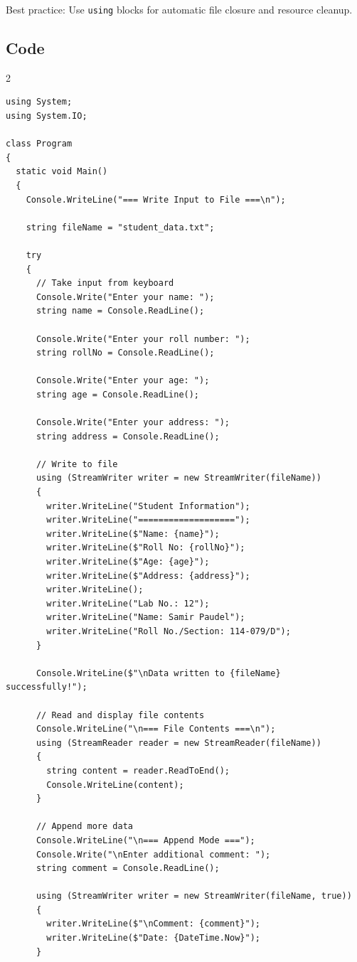 \documentclass[10pt,a4paper]{article}
\begin{document}
Best practice: Use \texttt{using} blocks for automatic file closure and resource cleanup.

\subsection*{Code}
\begin{multicols}{2}
\begin{lstlisting}
using System;
using System.IO;

class Program
{
  static void Main()
  {
    Console.WriteLine("=== Write Input to File ===\n");
    
    string fileName = "student_data.txt";
    
    try
    {
      // Take input from keyboard
      Console.Write("Enter your name: ");
      string name = Console.ReadLine();
      
      Console.Write("Enter your roll number: ");
      string rollNo = Console.ReadLine();
      
      Console.Write("Enter your age: ");
      string age = Console.ReadLine();
      
      Console.Write("Enter your address: ");
      string address = Console.ReadLine();
      
      // Write to file
      using (StreamWriter writer = new StreamWriter(fileName))
      {
        writer.WriteLine("Student Information");
        writer.WriteLine("===================");
        writer.WriteLine($"Name: {name}");
        writer.WriteLine($"Roll No: {rollNo}");
        writer.WriteLine($"Age: {age}");
        writer.WriteLine($"Address: {address}");
        writer.WriteLine();
        writer.WriteLine("Lab No.: 12");
        writer.WriteLine("Name: Samir Paudel");
        writer.WriteLine("Roll No./Section: 114-079/D");
      }
      
      Console.WriteLine($"\nData written to {fileName} successfully!");
      
      // Read and display file contents
      Console.WriteLine("\n=== File Contents ===\n");
      using (StreamReader reader = new StreamReader(fileName))
      {
        string content = reader.ReadToEnd();
        Console.WriteLine(content);
      }
      
      // Append more data
      Console.WriteLine("\n=== Append Mode ===");
      Console.Write("\nEnter additional comment: ");
      string comment = Console.ReadLine();
      
      using (StreamWriter writer = new StreamWriter(fileName, true))
      {
        writer.WriteLine($"\nComment: {comment}");
        writer.WriteLine($"Date: {DateTime.Now}");
      }
      

\end{lstlisting}
\end{multicols}
\end{document}
